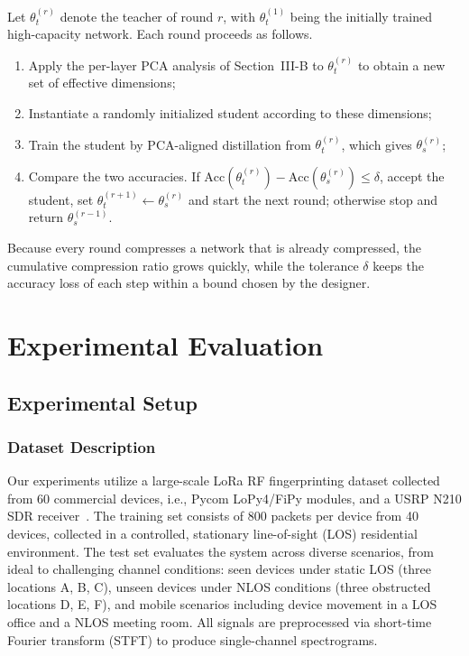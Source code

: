 \documentclass[journal,comsoc]{IEEEtran}
\begin{document}
Let $\theta_t^{(r)}$ denote the teacher of round $r$, with $\theta_t^{(1)}$ being the initially trained high-capacity network. Each round proceeds as follows.
\begin{enumerate}
    \item Apply the per-layer PCA analysis of Section~III-B to $\theta_t^{(r)}$ to obtain a new set of effective dimensions;
    \item Instantiate a randomly initialized student according to these dimensions;
    \item Train the student by PCA-aligned distillation from $\theta_t^{(r)}$, which gives $\theta_s^{(r)}$;
    \item Compare the two accuracies. If $\text{Acc}(\theta_t^{(r)}) - \text{Acc}(\theta_s^{(r)}) \le \delta$, accept the student, set $\theta_t^{(r+1)} \leftarrow \theta_s^{(r)}$ and start the next round; otherwise stop and return $\theta_s^{(r-1)}$.
\end{enumerate}
Because every round compresses a network that is already compressed, the cumulative compression ratio grows quickly, while the tolerance $\delta$ keeps the accuracy loss of each step within a bound chosen by the designer.


\section{Experimental Evaluation}
\label{sec:experimental_evaluation}

\subsection{Experimental Setup}
\label{subsec:experimental_setup}

\subsubsection{Dataset Description}
\label{subsubsec:dataset_description}

Our experiments utilize a large-scale LoRa RF fingerprinting dataset collected from 60 commercial devices, i.e., Pycom LoPy4/FiPy modules, and a USRP N210 SDR receiver~\cite{9715147}.
The training set consists of 800 packets per device from 40 devices, collected in a controlled, stationary line-of-sight (LOS) residential environment.
The test set evaluates the system across diverse scenarios, from ideal to challenging channel conditions: seen devices under static LOS (three locations A, B, C), unseen devices under NLOS conditions (three obstructed locations D, E, F), and mobile scenarios including device movement in a LOS office and a NLOS meeting room.
All signals are preprocessed via short-time Fourier transform (STFT) to produce single-channel spectrograms.
\end{document}
